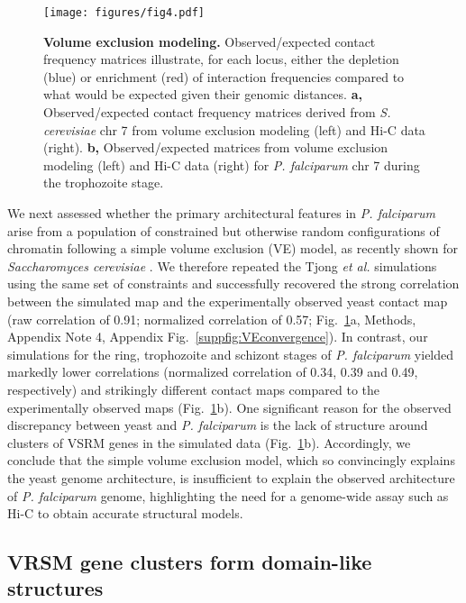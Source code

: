   \begin{figure}[h]
  \centering
\texttt{[image: figures/fig4.pdf]}
  \caption{{\bf Volume exclusion modeling. }
  Observed/expected contact frequency matrices illustrate, for each locus,
  either the depletion (blue) or enrichment (red) of interaction frequencies
  compared to what would be expected given their genomic distances.
  \textbf{a,} Observed/expected contact frequency matrices derived from {\em
  S. cerevisiae} chr 7 from volume exclusion modeling (left) and Hi-C data
  (right). \textbf{b,} Observed/expected matrices from volume exclusion
  modeling (left) and Hi-C data (right) for {\em P. falciparum} chr 7 during
  the trophozoite stage.}
  \label{fig:fig4}
  \end{figure}



We next assessed whether the primary architectural features in {\em P.
falciparum} arise from a population of constrained but otherwise random
configurations of chromatin following a simple volume exclusion (VE) model, as
recently shown for {\em Saccharomyces cerevisiae} \citep{tjong:physical}. We
therefore repeated the Tjong {\em et al.} simulations using the same set of
constraints and successfully recovered the strong correlation between the
simulated map and the experimentally observed yeast contact map (raw
correlation of 0.91; normalized correlation of 0.57; Fig.~\ref{fig:fig4}a,
Methods, Appendix Note 4, Appendix
Fig.~\ref{suppfig:VEconvergence}). In contrast, our simulations for the ring,
trophozoite and schizont stages of {\em P. falciparum} yielded markedly lower
correlations (normalized correlation of 0.34, 0.39 and 0.49, respectively) and
strikingly different contact maps compared to the experimentally observed maps
(Fig.~\ref{fig:fig4}b). One significant reason for the observed discrepancy
between yeast and {\em P. falciparum} is the lack of structure around clusters
of VSRM genes in the simulated data (Fig.~\ref{fig:fig4}b). Accordingly, we
conclude that the simple volume exclusion model, which so convincingly
explains the yeast genome architecture, is insufficient to explain the
observed architecture of {\em P. falciparum} genome, highlighting the need for
a genome-wide assay such as Hi-C to obtain accurate structural models.

\subsection{VRSM gene clusters form domain-like structures}

